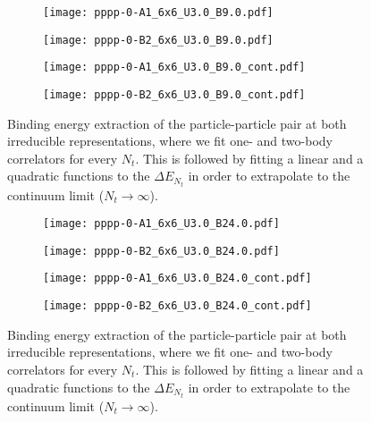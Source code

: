 \begin{figure}
  \begin{subfigure}{.5\textwidth}
    \centering
    \texttt{[image: pppp-0-A1\_6x6\_U3.0\_B9.0.pdf]}
  \end{subfigure}%
  \begin{subfigure}{.5\textwidth}
    \centering
    \texttt{[image: pppp-0-B2\_6x6\_U3.0\_B9.0.pdf]}
  \end{subfigure}
  \begin{subfigure}{.5\textwidth}
      \centering
      \texttt{[image: pppp-0-A1\_6x6\_U3.0\_B9.0\_cont.pdf]}
  \end{subfigure}
  \begin{subfigure}{.5\textwidth}
      \centering
      \texttt{[image: pppp-0-B2\_6x6\_U3.0\_B9.0\_cont.pdf]}
  \end{subfigure}
  \caption{Binding energy extraction of the particle-particle pair at both irreducible representations, where we fit one- and two-body correlators for every $N_t$. This is followed by fitting a linear and a quadratic functions to the $\Delta E_{N_t}$ in order to extrapolate to the continuum limit ($N_t\to\infty$).}
  \label{fig:fig13}
\end{figure}

\begin{figure}
  \begin{subfigure}{.5\textwidth}
    \centering
    \texttt{[image: pppp-0-A1\_6x6\_U3.0\_B24.0.pdf]}
  \end{subfigure}%
  \begin{subfigure}{.5\textwidth}
    \centering
    \texttt{[image: pppp-0-B2\_6x6\_U3.0\_B24.0.pdf]}
  \end{subfigure}
  \begin{subfigure}{.5\textwidth}
      \centering
      \texttt{[image: pppp-0-A1\_6x6\_U3.0\_B24.0\_cont.pdf]}
  \end{subfigure}
  \begin{subfigure}{.5\textwidth}
      \centering
      \texttt{[image: pppp-0-B2\_6x6\_U3.0\_B24.0\_cont.pdf]}
  \end{subfigure}
  \caption{Binding energy extraction of the particle-particle pair at both irreducible representations, where we fit one- and two-body correlators for every $N_t$. This is followed by fitting a linear and a quadratic functions to the $\Delta E_{N_t}$ in order to extrapolate to the continuum limit ($N_t\to\infty$).}
  \label{fig:fig14}
\end{figure}


